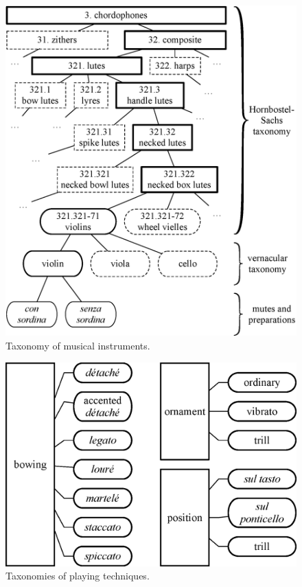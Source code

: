 \documentclass{article}
\begin{document}
\begin{figure}
\centering
\includegraphics[width=\linewidth]{./figs/dendrograms/instrument-dendrogram.eps}
\caption{Taxonomy of musical instruments.}
\label{fig:instrument-dendrogram}
\end{figure}


\begin{figure}
\centering
\includegraphics[width=\linewidth]{./figs/dendrograms/technique-dendrogram.eps}
\caption{Taxonomies of playing techniques.}
\label{fig:technique-dendrogram}
\end{figure}
\end{document}
